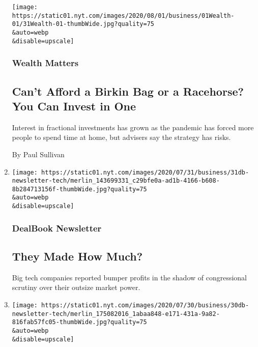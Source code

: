 \begin{enumerate}
  \texttt{[image: https://static01.nyt.com/images/2020/08/01/business/01Wealth-01/31Wealth-01-thumbWide.jpg?quality=75\\\&auto=webp\\\&disable=upscale]}

  \hypertarget{wealth-matters}{%
  \subsubsection{Wealth Matters}\label{wealth-matters}}

  \hypertarget{cant-afford-a-birkin-bag-or-a-racehorse-you-can-invest-in-one}{%
  \subsection{Can't Afford a Birkin Bag or a Racehorse? You Can Invest
  in
  One}\label{cant-afford-a-birkin-bag-or-a-racehorse-you-can-invest-in-one}}

  Interest in fractional investments has grown as the pandemic has
  forced more people to spend time at home, but advisers say the
  strategy has risks.

  By Paul Sullivan
\item
  \href{/2020/07/31/business/dealbook/tech-earnings-economy.html}{}

  \texttt{[image: https://static01.nyt.com/images/2020/07/31/business/31db-newsletter-tech/merlin\_143699331\_c29bfe0a-ad1b-4166-b608-8b284713156f-thumbWide.jpg?quality=75\\\&auto=webp\\\&disable=upscale]}

  \hypertarget{dealbook-newsletter-1}{%
  \subsubsection{DealBook Newsletter}\label{dealbook-newsletter-1}}

  \hypertarget{they-made-how-much}{%
  \subsection{They Made How Much?}\label{they-made-how-much}}

  Big tech companies reported bumper profits in the shadow of
  congressional scrutiny over their outsize market power.
\item
  \href{/2020/07/30/business/dealbook/tech-hearing-highlights.html}{}

  \texttt{[image: https://static01.nyt.com/images/2020/07/30/business/30db-newsletter-tech/merlin\_175082016\_1abaa848-e171-431a-9a82-816fab57fc05-thumbWide.jpg?quality=75\\\&auto=webp\\\&disable=upscale]}


\end{enumerate}
